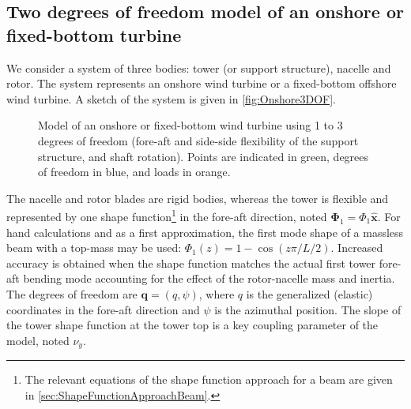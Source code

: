 \documentclass[wes, manuscript]{copernicus}
\renewcommand{\v}[1]{\boldsymbol{#1}}
\begin{document}




\subsection{Two degrees of freedom model of an onshore or fixed-bottom turbine}
\label{sec:Onshore1DOF}\label{sec:Onshore2DOF}
We consider a system of three bodies: tower (or support structure), nacelle and rotor.
    The system represents an onshore wind turbine or a fixed-bottom offshore wind turbine. 
A sketch of the system is given in \autoref{fig:Onshore3DOF}. 
\begin{figure}[!htb]%
 \centering%
 \def\svgwidth{0.6\columnwidth}%
 \caption{Model of an onshore or fixed-bottom wind turbine using 1 to 3 degrees of freedom (fore-aft and side-side flexibility of the support structure, and shaft rotation). Points are indicated in green, degrees of freedom in blue, and loads in orange.}\label{fig:Onshore3DOF}%
 \end{figure}%
The nacelle and rotor blades are rigid bodies, whereas the tower is flexible and represented by one shape function\footnote{
The relevant equations of the shape function approach for a beam are given in \autoref{sec:ShapeFunctionApproachBeam}.} in the fore-aft direction, noted $\v{\Phi}_1=\Phi_1 \v{\hat{x}}$.
For hand calculations and as a first approximation, the first mode shape of a massless beam with a top-mass may be used: $\Phi_1(z)=1-\cos(z\pi/L/2)$.
Increased accuracy is obtained when the shape function matches the actual first tower fore-aft bending mode accounting for the effect of the rotor-nacelle mass and inertia.
    The degrees of freedom are $\v{q}=(q, \psi)$, where $q$ is the generalized (elastic) coordinates in the fore-aft direction and $\psi$ is the azimuthal position.
The slope of the tower shape function at the tower top is a key coupling parameter of the model, noted  $\nu_y$.
\end{document}

